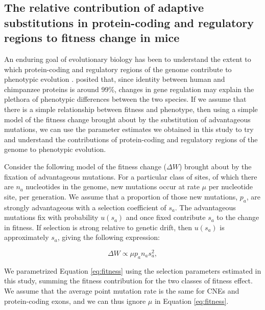 {\subsection{The relative contribution of adaptive substitutions in protein-coding and regulatory regions to fitness change in mice}

	An enduring goal of evolutionary biology has been to understand the extent to which protein-coding and regulatory regions of the genome contribute to phenotypic evolution \citep{RN347, RN346}. \cite{RN347} posited that, since identity between human and chimpanzee proteins is around 99\%, changes in gene regulation may explain the plethora of phenotypic differences between the two species. If we assume that there is a simple relationship between fitness and phenotype, then using a simple model of the fitness change brought about by the substitution of advantageous mutations, we can use the parameter estimates we obtained in this study to try and understand the contributions of protein-coding and regulatory regions of the genome to phenotypic evolution.

	Consider the following model of the fitness change ($\Delta W$) brought about by the fixation of advantageous mutations. For a particular class of sites, of which there are $n_a$ nucleotides in the genome, new mutations occur at rate $\mu$ per nucleotide site, per generation. We assume that a proportion of those new mutations, $p_a$, are strongly advantageous with a selection coefficient of $s_a$. The advantageous mutations fix with probability $u(s_a)$ and once fixed contribute $s_a$ to the change in fitness. If selection is strong relative to genetic drift, then $u(s_a)$ is approximately $s_a$, giving the following expression:

		\begin{equation}
		\label{eq:fitness}
		\Delta W \propto \mu p_a n_a s_a^2,
		\end{equation}

	We parametrized Equation \ref{eq:fitness} using the selection parameters estimated in this study, summing the fitness contribution for the two classes of fitness effect. We assume that the average point mutation rate is the same for CNEs and protein-coding exons, and we can thus ignore $\mu$ in Equation \ref{eq:fitness}. 
 
}
